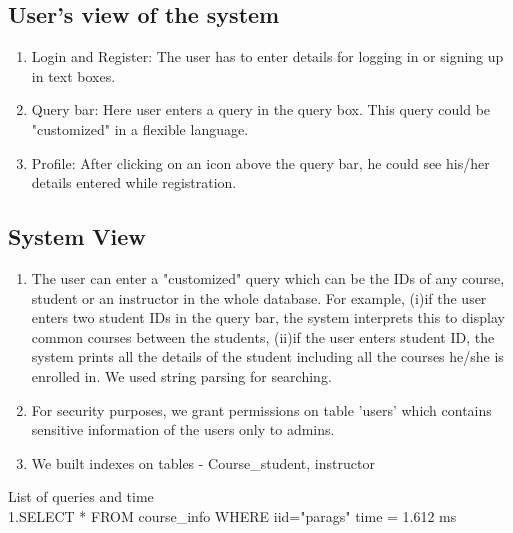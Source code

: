\documentclass{article}
\begin{document}
\subsection{User's view of the system}
\begin{enumerate}
\item Login and Register: The user has to enter details for logging in or signing up in text boxes.
\item Query bar: Here user enters a query in the query box. This query could be "customized" in a flexible language.
\item Profile: After clicking on an icon above the query bar, he could see his/her details entered while registration.
\end{enumerate}
\subsection{System View}
\begin{enumerate}
\subsection{List of queries}
\begin{enumerate}
\item Login Page
\begin{enumerate}
\item SELECT password FROM users WHERE userid=\$1;
\item INSERT INTO users VALUES(username,userid,password,email);
\end{enumerate}
\item Profile page
\begin{enumerate}
\item UPDATE users SET password=\$1 WHERE userid=\$2;
\end{enumerate}
\begin{enumerate}
\item Qurery bar
\begin{enumerate}
\item SELECT * from course\_info WHERE iid=\$1;
\end{enumerate}
\end{enumerate}
\end{enumerate}

\item The user can enter a "customized" query which can be the IDs of any course, student or an instructor in the whole database. For example, (i)if the user enters two student IDs in the query bar, the system interprets this to display common courses between the students, (ii)if the user enters student ID, the system prints all the details of the student including all the courses he/she is enrolled in. We used string parsing for searching.
\item For security purposes, we grant permissions on table 'users' which contains sensitive information of the users only to admins.
\item We built indexes on tables - Course\_student, instructor
\end{enumerate}
List of queries and time \\
1.SELECT * FROM course\_info WHERE iid="parags" time = 1.612 ms
\newpage
\end{document}
